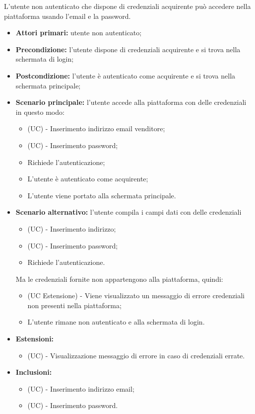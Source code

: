 L'utente non autenticato che dispone di credenziali acquirente può accedere nella piattaforma usando l'email e la password.
\begin{itemize}
	\item \textbf{Attori primari:} utente non autenticato;
	\item \textbf{Precondizione:} l'utente dispone di credenziali acquirente e si trova nella schermata di login;
	\item \textbf{Postcondizione:} l'utente è autenticato come acquirente e si trova nella schermata principale;
	\item \textbf{Scenario principale:} l'utente accede alla piattaforma con delle credenziali in questo modo:
	\begin{itemize}
		\item (UC) - Inserimento indirizzo email venditore;
		\item (UC) - Inserimento password;
		\item Richiede l'autenticazione;
		\item L'utente è autenticato come acquirente;
		\item L'utente viene portato alla schermata principale.
	\end{itemize}
	\item \textbf{Scenario alternativo:} l'utente compila i campi dati con delle credenziali
	\begin{itemize}
		\item (UC) - Inserimento indirizzo;
		\item (UC) - Inserimento password;
		\item Richiede l'autenticazione.
	\end{itemize}
	Ma le credenziali fornite non appartengono alla piattaforma, quindi:
	\begin{itemize}
		\item (UC Estensione) - Viene visualizzato un messaggio di errore credenziali non presenti nella piattaforma;
		\item L'utente rimane non autenticato e alla schermata di login.
	\end{itemize}
	\item \textbf{Estensioni:}
	\begin{itemize}
		\item (UC) - Visualizzazione messaggio di errore in caso di credenziali errate.
	\end{itemize}
	\item \textbf{Inclusioni:}
	\begin{itemize}
		\item (UC) - Inserimento indirizzo email;
		\item (UC) - Inserimento  password. 
		\end{itemize}
\end{itemize}


